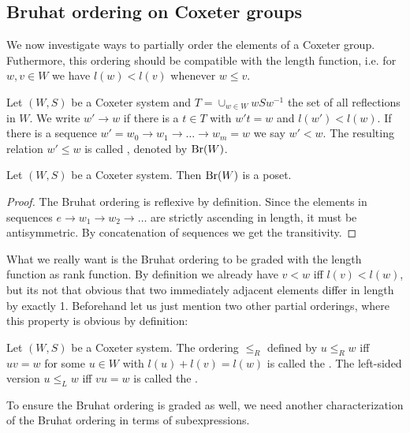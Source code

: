 \subsection{Bruhat ordering on Coxeter groups}
\label{sec:coxeter-groups-bruhat-ordering}

We now investigate ways to partially order the elements of a Coxeter group. Futhermore, this ordering should be compatible with the length function, i.e. for $w,v \in W$ we have $l(w) < l(v)$ whenever $w \leq v$.

\begin{defi}
	Let $(W,S)$ be a Coxeter system and $T = \cup_{w \in W} wSw^{-1}$ the set of all reflections in $W$. We write $w' \to w$ if there is a $t \in T$ with $w't = w$ and $l(w') < l(w)$. If there is a sequence $w' = w_0 \to w_1 \to \ldots \to w_m = w$ we say $w' < w$. The resulting relation $w' \leq w$ is called , denoted by $\operatorname{Br}(W)$.
\end{defi}

\begin{lemm}
	Let $(W,S)$ be a Coxeter system. Then $\operatorname{Br}(W)$ is a poset.

	\begin{proof}
		The Bruhat ordering is reflexive by definition. Since the elements in sequences $e \to w_1 \to w_2 \to \ldots$ are strictly ascending in length, it must be antisymmetric. By concatenation of sequences we get the transitivity.
	\end{proof}
\end{lemm}

What we really want is the Bruhat ordering to be graded with the length function as rank function. By definition we already have $v < w$ iff $l(v) < l(w)$, but its not that obvious that two immediately adjacent elements differ in length by exactly 1. Beforehand let us just mention two other partial orderings, where this property is obvious by definition:

\begin{defi}
	Let $(W,S)$ be a Coxeter system. The ordering $\leq_R$ defined by $u \leq_R w$ iff $uv = w$ for some $u \in W$ with $l(u) + l(v) = l(w)$ is called the . The left-sided version $u \leq_L w$ iff $vu = w$ is called the .
\end{defi}

To ensure the Bruhat ordering is graded as well, we need another characterization of the Bruhat ordering in terms of subexpressions.

